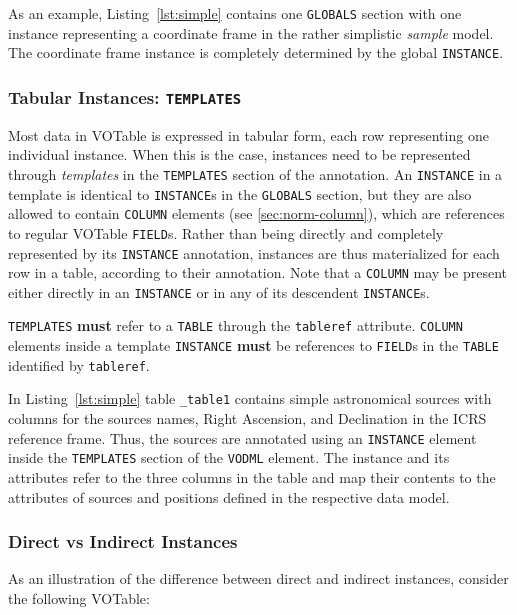 \documentclass[11pt,a4paper]{ivoa}
\begin{document}
As an example, Listing~\ref{lst:simple} contains one \texttt{GLOBALS} section
with one instance representing a coordinate frame in the rather
simplistic \emph{sample} model. The coordinate frame instance is
completely determined by the global \texttt{INSTANCE}.

\subsubsection{Tabular Instances:
\texttt{TEMPLATES}}\label{sec:norm-templates}

Most data in VOTable is expressed in tabular form, each row representing
one individual instance. When this is the case, instances need to be
represented through \emph{templates} in the \texttt{TEMPLATES} section
of the annotation. An \texttt{INSTANCE} in a template is identical to
\texttt{INSTANCE}s in the \texttt{GLOBALS} section, but they are also
allowed to contain \texttt{COLUMN} elements (see
\ref{sec:norm-column}), which are references to regular VOTable
\texttt{FIELD}s. Rather than being directly and completely represented
by its \texttt{INSTANCE} annotation, instances are thus materialized for
each row in a table, according to their annotation. Note that a
\texttt{COLUMN} may be present either directly in an \texttt{INSTANCE}
or in any of its descendent \texttt{INSTANCE}s.

\texttt{TEMPLATES} \textbf{must} refer to a \texttt{TABLE} through the
\texttt{tableref} attribute. \texttt{COLUMN} elements inside a template
\texttt{INSTANCE} \textbf{must} be references to \texttt{FIELD}s in the
\texttt{TABLE} identified by \texttt{tableref}.

In Listing~\ref{lst:simple} table \texttt{\_table1} contains simple
astronomical sources with columns for the sources names, Right
Ascension, and Declination in the ICRS reference frame. Thus, the
sources are annotated using an \texttt{INSTANCE} element inside the
\texttt{TEMPLATES} section of the \texttt{VODML} element. The instance
and its attributes refer to the three columns in the table and map their
contents to the attributes of sources and positions defined in the
respective data model.

\subsubsection{Direct vs Indirect
Instances}\label{direct-vs-indirect-instances}

As an illustration of the difference between direct and indirect
instances, consider the following VOTable:
\end{document}
